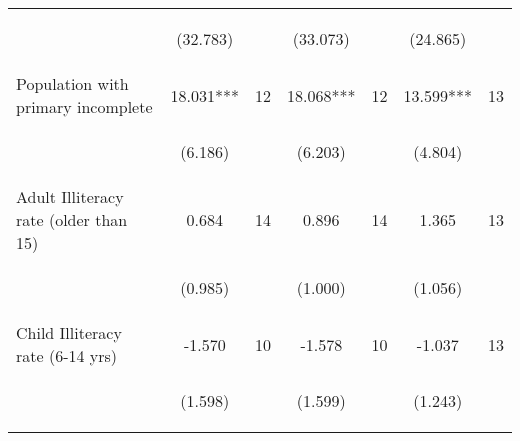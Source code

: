 \begin{tabular}{lcccccc}
\vspace{4pt} &  \begin{footnotesize}(32.783)\end{footnotesize}   & &
			    \begin{footnotesize}(33.073)\end{footnotesize}   & &
			    \begin{footnotesize}(24.865)\end{footnotesize}   &
			     \\          

Population with primary incomplete   &  18.031***   &  12  &   18.068***  &  12 &  13.599***  &  13   \\

\vspace{4pt} &  \begin{footnotesize}(6.186)\end{footnotesize}   & &
			    \begin{footnotesize}(6.203)\end{footnotesize}   & &
			    \begin{footnotesize}(4.804)\end{footnotesize}   &
			     \\          

Adult Illiteracy rate (older than 15)   &  0.684   &  14  &   0.896  &  14 &  1.365  &  13   \\

\vspace{4pt} &  \begin{footnotesize}(0.985)\end{footnotesize}   & &
			    \begin{footnotesize}(1.000)\end{footnotesize}   & &
			    \begin{footnotesize}(1.056)\end{footnotesize}   &
			     \\          

Child Illiteracy rate (6-14 yrs)   &  -1.570   &  10  &   -1.578  &  10 &  -1.037  &  13   \\

\vspace{4pt} &  \begin{footnotesize}(1.598)\end{footnotesize}   & &
			    \begin{footnotesize}(1.599)\end{footnotesize}   & &
			    \begin{footnotesize}(1.243)\end{footnotesize}   &
			     \\          


\end{tabular}
